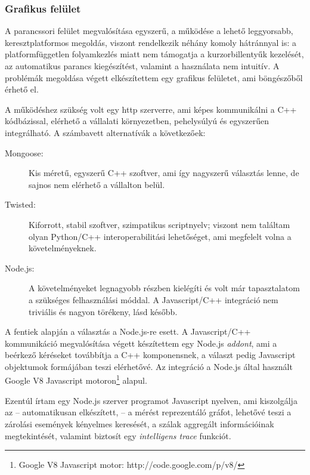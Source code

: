     \subsubsection{Grafikus felület}
    A parancssori felület megvalósítása egyszerű, a működése a lehető leggyorsabb, keresztplatformos megoldás, viszont rendelkezik néhány komoly hátránnyal is: a platformfüggetlen folyamkezlés miatt nem támogatja a kurzorbillentyűk kezelését, az automatikus parancs kiegészítést, valamint a használata nem intuitív. A problémák megoldása végett elkészítettem egy grafikus felületet, ami böngészőből érhető el.
    
    A működéshez szükség volt egy http szerverre, ami képes kommunikálni a C++ kódbázissal, elérhető a vállalati környezetben, pehelysúlyú és egyszerűen integrálható. A számbavett alternatívák a következőek:
    
\begin{description}
    \item[Mongoose:\footnotemark] Kis méretű, egyszerű C++ szoftver, ami így nagyszerű választás lenne, de sajnos nem elérhető a vállalton belül.
    \item[Twisted:\footnotemark]  Kiforrott, stabil szoftver, szimpatikus scriptnyelv; viszont nem találtam olyan Python/C++ interoperabilitási lehetőséget, ami megfelelt volna a követelményeknek.
    \item[Node.js:\footnotemark]  A követelményeket legnagyobb részben kielégíti és volt már tapasztalatom a szükséges felhasználási móddal. A Javascript/C++ integráció nem triviális és nagyon törékeny, lásd később.
   
\end{description}
%    
    A fentiek alapján a választás a Node.js-re esett. A Javascript/C++ kommunikáció megvalósítása végett készítettem egy Node.js \emph{addont}, ami a beérkező kéréseket továbbítja a C++ komponensnek, a választ pedig Javascript objektumok formájában teszi elérhetővé. Az integráció a Node.js által használt Google V8 Javascript motoron\footnote{Google V8 Javascript motor: http://code.google.com/p/v8/} alapul.
   
    Ezentúl írtam egy Node.js szerver programot Javascript nyelven, ami kiszolgálja az -- automatikusan elkészített, -- a mérést reprezentáló gráfot, lehetővé teszi a zárolási események kényelmes keresését, a szálak aggregált információinak megtekintését, valamint biztosít egy \emph{intelligens trace} funkciót.
    
